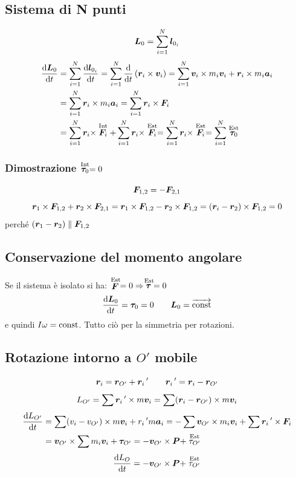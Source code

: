 \subsection{Sistema di N punti}
\begin{equation*}\boldsymbol{L}_0=\sum_{i=1}^N \boldsymbol{l}_{0_i}\end{equation*}
\begin{align*}\frac{\mathrm{d} \boldsymbol{L}_0}{\mathrm{d} t}&=\sum_{i=1}^{N}\frac{\mathrm{d} \boldsymbol{l}_{0_i}}{\mathrm{d}
t}=\sum_{i=1}^{N}\frac{\mathrm{d}}{\mathrm{d} t}\left(\boldsymbol{r}_i \times \boldsymbol{v}_i\right)=\sum_{i=1}^{N}\boldsymbol{v}_i\times m_i \boldsymbol{v}_i+\boldsymbol{r}_i\times m_i\boldsymbol{a}_i\\
&=\sum_{i=1}^{N}\boldsymbol{r}_i\times m_i\boldsymbol{a}_i=\sum_{i=1}^{N}\boldsymbol{r}_i\times\boldsymbol{F}_i\\
&=\sum_{i=1}^{N}\boldsymbol{r}_i\times\stackrel{\text{Int}}{\boldsymbol{F}_i}+\sum_{i=1}^{N}\boldsymbol{r}_i\times\stackrel{\text{Est}}{\boldsymbol{F}_i}=\sum_{i=1}^{N}\boldsymbol{r}_i\times \stackrel{\text{Est}}{\boldsymbol{F}_i}=\sum_{i=1}^{N}\stackrel{\text{Est}}{\boldsymbol{\tau}_0}\end{align*}
\subsubsection{Dimostrazione $\stackrel{\text{Int}}{\boldsymbol{\tau}_0}=0$}
\begin{equation*}\boldsymbol{F}_{1,2}=-\boldsymbol{F}_{2,1}\end{equation*}
\begin{equation*}\boldsymbol{r}_1\times \boldsymbol{F}_{1,2}+\boldsymbol{r}_2\times\boldsymbol{F}_{2,1}=\boldsymbol{r}_1\times \boldsymbol{F}_{1,2}-\boldsymbol{r}_2\times\boldsymbol{F}_{1,2}=\left(\boldsymbol{r}_i-\boldsymbol{r}_2\right)\times\boldsymbol{F}_{1,2}=0\end{equation*}
perché $\left(\boldsymbol{r}_1-\boldsymbol{r}_2\right)\parallel \boldsymbol{F}_{1,2}$
\subsection{Conservazione del momento angolare}
Se il sistema è isolato si ha: $\stackrel{\text{Est}}{\boldsymbol{F}}=0\Rightarrow \stackrel{\text{Est}}{\boldsymbol{\tau}}=0$
\[\frac{\mathrm{d} \boldsymbol{L}_0}{\mathrm{d} t}=\boldsymbol{\tau}_0=0\qquad \boldsymbol{L}_0=\overrightarrow{\text{const}}\]
 e quindi
$I\omega={\text{const}}$. Tutto ciò per la simmetria per
rotazioni.
\subsection{Rotazione intorno a $O'$ mobile}
\begin{equation*}\boldsymbol{r}_i=\boldsymbol{r}_{O'}+\boldsymbol{r}_i\,'\qquad \boldsymbol{r}_i\,'=\boldsymbol{r}_i-\boldsymbol{r}_{O'}\end{equation*}
\[L_{O'}=\sum\boldsymbol{r}_i\,'\times m\boldsymbol{v}_i=\sum(\boldsymbol{r}_i-\boldsymbol{r}_{O'})\times m\boldsymbol{v}_i\]
\begin{align*}
\frac{\mathrm{d} L_{O'}}{\mathrm{d} t}&=\sum(v_i-v_{O'})\times m\boldsymbol{v}_i+r_i\,' m\boldsymbol{a}_i=-\sum\boldsymbol{v}_{O'}\times m_i\boldsymbol{v}_i+\sum\boldsymbol{r}_i\,'\times\boldsymbol{F}_i\\
&=\boldsymbol{v}_{O'}\times\sum m_i\boldsymbol{v}_i+\boldsymbol{\tau}_{O'}=-\boldsymbol{v}_{O'}\times\boldsymbol{P}+\stackrel{\text{Est}}{\tau_{O'}}
\end{align*}
\begin{equation*}\frac{\mathrm{d} L_O}{\mathrm{d} t}=-\boldsymbol{v}_{O'}\times\boldsymbol{P}+\stackrel{\text{Est}}{\tau_{O'}}\end{equation*}

